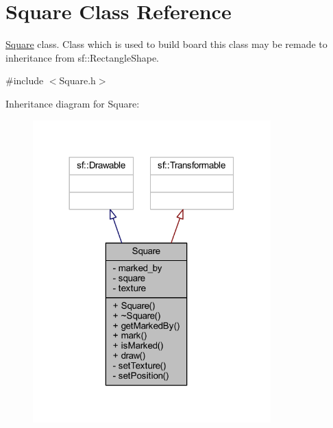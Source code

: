 \hypertarget{class_square}{}\section{Square Class Reference}
\label{class_square}


\hyperlink{class_square}{Square} class. Class which is used to build board this class may be remade to inheritance from sf\+::\+Rectangle\+Shape.  




{\ttfamily \#include $<$Square.\+h$>$}



Inheritance diagram for Square\+:
\nopagebreak
\begin{figure}[H]
\begin{center}
\leavevmode
\includegraphics[width=260pt]{class_square__inherit__graph}
\end{center}
\end{figure}


